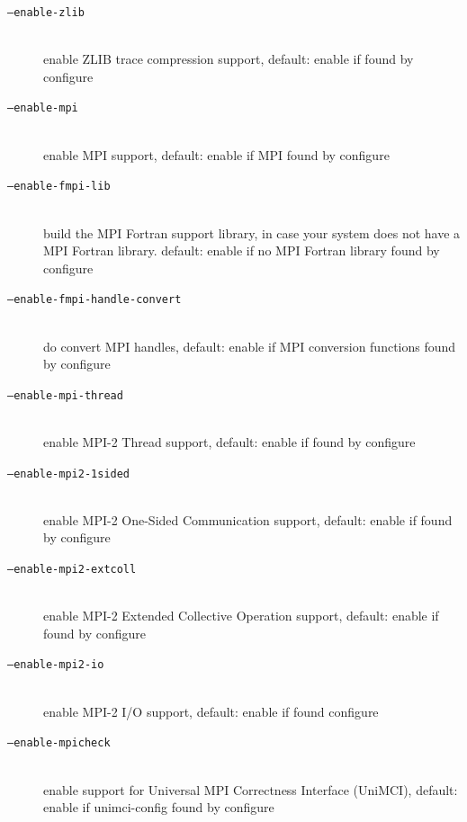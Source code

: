 \documentclass[a4paper,twoside,12pt,BCOR12mm]{scrbook}
\begin{document}
\begin{latexonly}
\begin{description}
\item[\texttt{--enable-zlib}] ~\\
                              enable ZLIB trace compression support, default:
                              enable if found by configure

\item[\texttt{--enable-mpi}] ~\\
                              enable MPI support, default: enable if
                              MPI found by configure

\item[\texttt{--enable-fmpi-lib}] ~\\
                              build the MPI Fortran support library, in case your 
                              system does not have a MPI Fortran library.
                              default: enable if no MPI Fortran library 
                              found by configure

\item[\texttt{--enable-fmpi-handle-convert}] ~\\
                              do convert MPI handles, default: enable if MPI
                              conversion functions found by configure

\item[\texttt{--enable-mpi-thread}] ~\\
                              enable MPI-2 Thread support, default: enable if
                              found by configure

\item[\texttt{--enable-mpi2-1sided}] ~\\
                              enable MPI-2 One-Sided Communication support,
                              default: enable if found by configure

\item[\texttt{--enable-mpi2-extcoll}] ~\\
                              enable MPI-2 Extended Collective Operation support,
                              default: enable if found by configure

\item[\texttt{--enable-mpi2-io}] ~\\
                              enable MPI-2 I/O support, default: enable if found
                              configure

\item[\texttt{--enable-mpicheck}] ~\\
                              enable support for Universal MPI Correctness
                              Interface (UniMCI), default: enable if
                              unimci-config found by configure


\end{description}
\end{latexonly}
\end{document}
